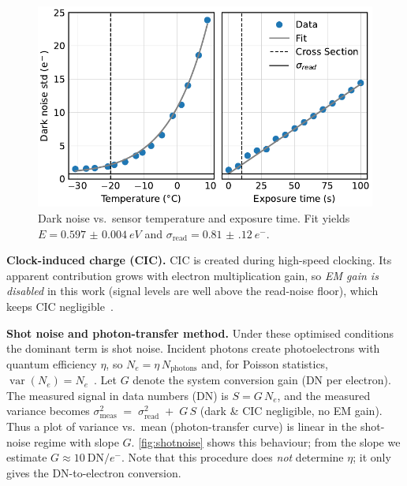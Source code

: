 \documentclass[
	parskip=half,
	a4paper,
]{scrarticle}
\begin{document}
\begin{figure}
    \centering
    \includegraphics{../analysis/figures/dark_noise.pdf}
    \caption{Dark noise vs.\ sensor temperature and exposure time. Fit yields \(E=\SI{0.597(4)}{eV}\) and \(\sigma_{\text{read}}=\SI{0.81(12)}{e^{-}}\).}
    \label{fig:dark_noise}
\end{figure}

\textbf{Clock-induced charge (CIC).}
CIC is created during high-speed clocking.
Its apparent contribution grows with electron multiplication gain, so \emph{EM gain is disabled} in this work (signal levels are well above the read-noise floor), which keeps CIC negligible~\cite{andor_establishing_nodate}.

\textbf{Shot noise and photon-transfer method.}
Under these optimised conditions the dominant term is shot noise.
Incident photons create photoelectrons with quantum efficiency \(\eta\), so \(N_e=\eta\,N_{\text{photons}}\) and, for Poisson statistics, \(\operatorname{var}(N_e)=N_e\)~\cite{european_machine_vision_association_standard_2010}.
Let \(G\) denote the system conversion gain (DN per electron). The measured signal in data numbers (DN) is \(S = G\,N_e\), and the measured variance becomes \(\sigma^2_{\text{meas}} \;=\; \sigma_{\text{read}}^2 \;+\; G\,S\) (dark \& CIC negligible, no EM gain).
Thus a plot of variance vs.\ mean (photon-transfer curve) is linear in the shot-noise regime with slope \(G\).
\autoref{fig:shotnoise} shows this behaviour; from the slope we estimate \(G \approx 10~\text{DN}/e^{-}\).
Note that this procedure does \emph{not} determine \(\eta\); it only gives the DN-to-electron conversion.
\end{document}
